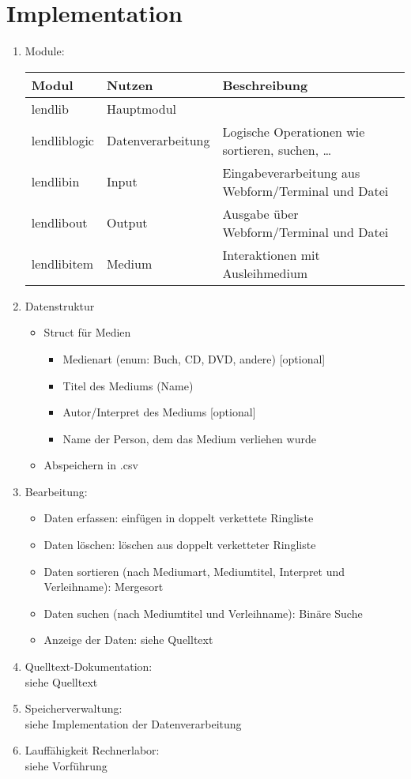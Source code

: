 \section{Implementation}
\begin{enumerate}
\item Module:\\
\begin{tabular}{l l l}
Modul & Nutzen & Beschreibung\\
\hline
lendlib & Hauptmodul & \\
lendliblogic & Datenverarbeitung & Logische Operationen wie sortieren, suchen, …\\ 
lendlibin & Input & Eingabeverarbeitung aus Webform/Terminal und Datei\\
lendlibout & Output & Ausgabe über Webform/Terminal und Datei\\
lendlibitem & Medium & Interaktionen mit Ausleihmedium\\
\end{tabular}
\item Datenstruktur
\begin{itemize}
\item Struct für Medien
\begin{itemize}
\item Medienart (enum: Buch, CD, DVD, andere) [optional]
\item Titel des Mediums (Name)
\item Autor/Interpret des Mediums [optional]
\item Name der Person, dem das Medium verliehen wurde
\end{itemize}
\item Abspeichern in .csv
\end{itemize}
\item Bearbeitung:
\begin{itemize}
\item Daten erfassen: einfügen in doppelt verkettete Ringliste
\item Daten löschen: löschen aus doppelt verketteter Ringliste
\item Daten sortieren (nach Mediumart, Mediumtitel, Interpret und Verleihname): Mergesort
\item Daten suchen (nach Mediumtitel und Verleihname): Binäre Suche
\item Anzeige der Daten: siehe Quelltext
\end{itemize}
\item Quelltext-Dokumentation:\\
siehe Quelltext
\item Speicherverwaltung:\\
siehe Implementation der Datenverarbeitung
\item Lauffähigkeit Rechnerlabor:\\
siehe Vorführung
\end{enumerate}

